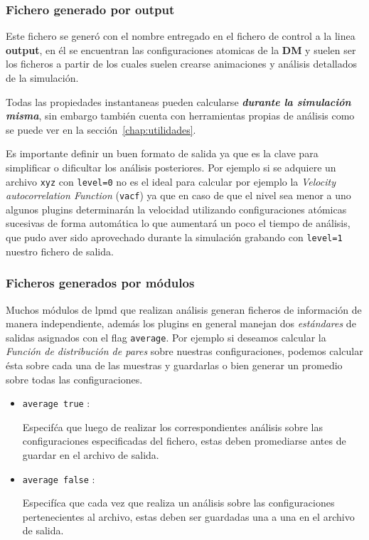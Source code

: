 \subsubsection{Fichero generado por output}

Este fichero se gener\'o con el nombre entregado en el fichero de control a la
linea \textbf{output}, en \'el se encuentran las configuraciones atomicas de la
\textbf{DM} y suelen ser los ficheros a partir de los cuales suelen crearse
animaciones y an\'alisis detallados de la simulaci\'on.

Todas las propiedades instantaneas pueden calcularse \textit{\textbf{durante la
simulaci\'on misma}}, sin embargo {\lpmd} tambi\'en cuenta con herramientas
propias de an\'alisis como se puede ver en la secci\'on~\ref{chap:utilidades}.

Es importante definir un buen formato de salida ya que es la clave para
simplificar o dificultar los an\'alisis posteriores. Por ejemplo si se adquiere
un archivo \verb|xyz| con \verb|level=0| no es el ideal para calcular por
ejemplo la \textit{Velocity autocorrelation Function} (\verb|vacf|) ya que en
caso de que el nivel sea menor a uno algunos plugins determinar\'an la velocidad
utilizando configuraciones at\'omicas sucesivas de forma autom\'atica lo que
aumentar\'a un poco el tiempo de an\'alisis, que pudo aver sido aprovechado
durante la simulaci\'on grabando con \verb|level=1| nuestro fichero de salida.

\subsubsection{Ficheros generados por m\'odulos}
Muchos m\'odulos de lpmd que realizan an\'alisis generan ficheros de
informaci\'on de manera independiente, adem\'as los plugins en general manejan
dos \textit{est\'andares} de salidas asignados con el flag \verb|average|. Por
ejemplo si deseamos calcular la \textit{Funci\'on de distribuci\'on de pares}
sobre nuestras configuraciones, podemos calcular \'esta sobre cada una de las
muestras y guardarlas o bien generar un promedio sobre todas las
configuraciones.

\begin{itemize}
\item \verb|average true| :

Especif\'ca que luego de realizar los correspondientes an\'alisis sobre las
configuraciones especificadas del fichero, estas deben promediarse antes de
guardar en el archivo de salida.
\item \verb|average false| :

Especif\'ica que cada vez que realiza un an\'alisis sobre las configuraciones
pertenecientes al archivo, estas deben ser guardadas una a una en el archivo de
salida. 
\end{itemize}
